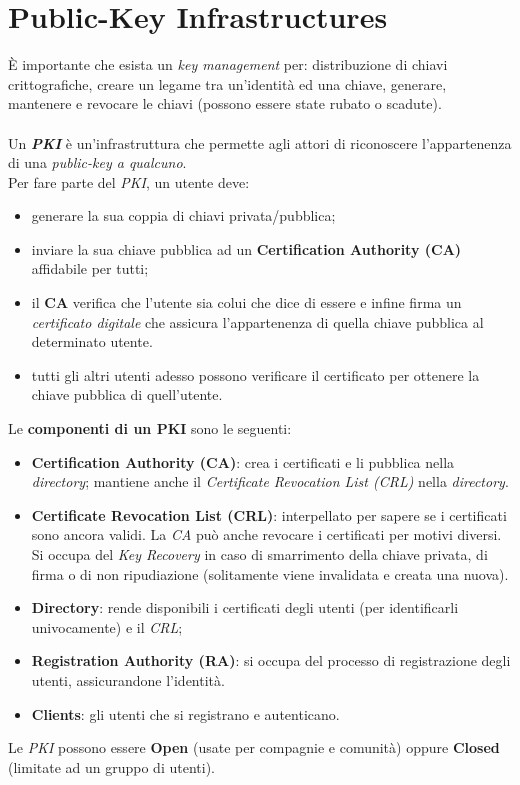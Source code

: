 \documentclass[11pt, a4paper, twoside, italian]{report}
\theoremstyle{plain}
\begin{document}
\chapter*{Public-Key Infrastructures}
È importante che esista un \textit{key management} per: distribuzione di chiavi crittografiche, creare un legame tra un'identità ed una chiave, generare, mantenere e revocare le chiavi (possono essere state rubato o scadute).\\\\
Un \textit{\textbf{PKI}} è un'infrastruttura che permette agli attori di riconoscere l'appartenenza di una \textit{public-key a qualcuno}.\\
Per fare parte del \textit{PKI}, un utente deve:
\begin{itemize}
	\item generare la sua coppia di chiavi privata/pubblica;
	\item inviare la sua chiave pubblica ad un \textbf{Certification Authority (CA)} affidabile per tutti;
	\item il \textbf{CA} verifica che l'utente sia colui che dice di essere e infine firma un \textit{certificato digitale} che assicura l'appartenenza di quella chiave pubblica al determinato utente.
	\item tutti gli altri utenti adesso possono verificare il certificato per ottenere la chiave pubblica di quell'utente.
\end{itemize}
\noindent
Le \textbf{componenti di un PKI} sono le seguenti:
\begin{itemize}
	\item \textbf{Certification Authority (CA)}: crea i certificati e li pubblica nella \textit{directory}; mantiene anche il \textit{Certificate Revocation List (CRL)} nella \textit{directory}.
	\item \textbf{Certificate Revocation List (CRL)}: interpellato per sapere se i certificati sono ancora validi. La \textit{CA} può anche revocare i certificati per motivi diversi. Si occupa del \textit{Key Recovery} in caso di smarrimento della chiave privata, di firma o di non ripudiazione (solitamente viene invalidata e creata una nuova).
	\item \textbf{Directory}: rende disponibili i certificati degli utenti (per identificarli univocamente) e il \textit{CRL};
	\item \textbf{Registration Authority (RA)}: si occupa del processo di registrazione degli utenti, assicurandone l'identità.
	\item \textbf{Clients}: gli utenti che si registrano e autenticano.
\end{itemize}
\noindent
Le \textit{PKI} possono essere \textbf{Open} (usate per compagnie e comunità) oppure \textbf{Closed} (limitate ad un gruppo di utenti).
\end{document}
